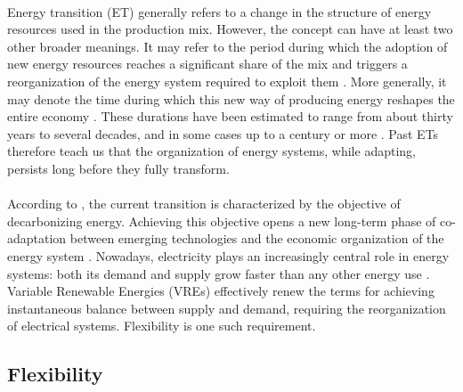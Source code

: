 \documentclass[12pt]{article}
\begin{document}
\paragraph{}
Energy transition (ET) generally refers to a change in the structure of energy resources used in the production mix. However, the concept can  have at least two other broader meanings. It may refer to the period during which the adoption of new energy resources reaches a significant share of the mix and triggers a reorganization of the energy system required to exploit them \citet{smil2010}. More generally, it may denote the time during which this new way of producing energy reshapes the entire economy \citep{crafts2004,bergquist2023}. These durations have been estimated to range from about thirty years to several decades, and in some cases up to a century or more \citep{fouquet2016}. Past ETs therefore teach us that the organization of energy systems, while adapting, persists long before they fully transform.

\paragraph{}
According to \citet{smil2010}, the current transition is characterized by the objective of decarbonizing energy. Achieving this objective opens a new long-term phase of co-adaptation between emerging technologies and the economic organization of the energy system \citep{grubler2012}. Nowadays, electricity plays an increasingly central role in energy systems: both its demand and supply grow faster than any other energy use \citep{iea2025}. Variable Renewable Energies (VREs) effectively renew the terms for achieving instantaneous balance between supply and demand, requiring the reorganization of electrical systems. Flexibility is one such requirement.

\subsection{Flexibility}
\end{document}
